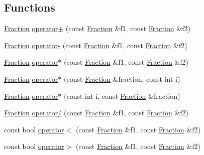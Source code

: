 \subsection*{Functions}
\begin{DoxyCompactItemize}
\item 
\hyperlink{classprism_1_1utils_1_1_fraction}{Fraction} \hyperlink{namespaceprism_1_1utils_a474442ddaf983033fbb719c771f7493a}{operator+} (const \hyperlink{classprism_1_1utils_1_1_fraction}{Fraction} \&f1, const \hyperlink{classprism_1_1utils_1_1_fraction}{Fraction} \&f2)
\item 
\hyperlink{classprism_1_1utils_1_1_fraction}{Fraction} \hyperlink{namespaceprism_1_1utils_a4d4185ebe9da8aa4a143e5fd9216fc97}{operator-\/} (const \hyperlink{classprism_1_1utils_1_1_fraction}{Fraction} \&f1, const \hyperlink{classprism_1_1utils_1_1_fraction}{Fraction} \&f2)
\item 
\hyperlink{classprism_1_1utils_1_1_fraction}{Fraction} \hyperlink{namespaceprism_1_1utils_a5455803455c03518b8d1b05529bc7aa5}{operator$\ast$} (const \hyperlink{classprism_1_1utils_1_1_fraction}{Fraction} \&f1, const \hyperlink{classprism_1_1utils_1_1_fraction}{Fraction} \&f2)
\item 
\hyperlink{classprism_1_1utils_1_1_fraction}{Fraction} \hyperlink{namespaceprism_1_1utils_a3107b28878719ceb099524879db3d904}{operator$\ast$} (const \hyperlink{classprism_1_1utils_1_1_fraction}{Fraction} \&fraction, const int i)
\item 
\hyperlink{classprism_1_1utils_1_1_fraction}{Fraction} \hyperlink{namespaceprism_1_1utils_af8263539b5b9ca4f07994be859985909}{operator$\ast$} (const int i, const \hyperlink{classprism_1_1utils_1_1_fraction}{Fraction} \&fraction)
\item 
\hyperlink{classprism_1_1utils_1_1_fraction}{Fraction} \hyperlink{namespaceprism_1_1utils_a93a5518c800c0cb4cf9ba915dbe1304f}{operator/} (const \hyperlink{classprism_1_1utils_1_1_fraction}{Fraction} \&f1, const \hyperlink{classprism_1_1utils_1_1_fraction}{Fraction} \&f2)
\item 
const bool \hyperlink{namespaceprism_1_1utils_a97fec2143478c69e0f17ad608a407c5a}{operator$<$} (const \hyperlink{classprism_1_1utils_1_1_fraction}{Fraction} \&f1, const \hyperlink{classprism_1_1utils_1_1_fraction}{Fraction} \&f2)
\item 
const bool \hyperlink{namespaceprism_1_1utils_af66837bba390f22aa37847be3927d456}{operator$>$} (const \hyperlink{classprism_1_1utils_1_1_fraction}{Fraction} \&f1, const \hyperlink{classprism_1_1utils_1_1_fraction}{Fraction} \&f2)

\end{DoxyCompactItemize}
